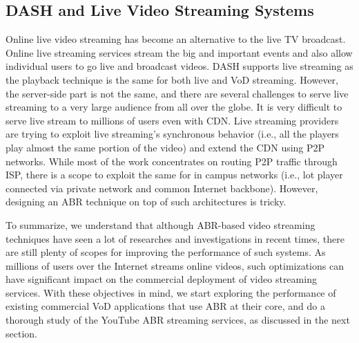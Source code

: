 \subsection{DASH and Live Video Streaming Systems}
Online live video streaming has become an alternative to the live \ac{TV} broadcast. Online live streaming services stream the big and important events and also allow individual users to go live and broadcast videos. \ac{DASH} supports live streaming as the playback technique is the same for both live and \ac{VoD} streaming. However, the server-side part is not the same, and there are several challenges to serve live streaming to a very large audience from all over the globe. It is very difficult to serve live stream to millions of users even with \ac{CDN}. Live streaming providers are trying to exploit live streaming's synchronous behavior (i.e., all the players play almost the same portion of the video) and extend the \ac{CDN} using \ac{P2P} networks. While most of the work concentrates on routing \ac{P2P} traffic through \ac{ISP}, there is a scope to exploit the same for in campus networks (i.e., lot player connected via private network and common Internet backbone). However, designing an \ac{ABR} technique on top of such architectures is tricky.

To summarize, we understand that although \ac{ABR}-based video streaming techniques have seen a lot of researches and investigations in recent times, there are still plenty of scopes for improving the performance of such systems. As millions of users over the Internet streams online videos, such optimizations can have significant impact on the commercial deployment of video streaming services. With these objectives in mind, we start exploring the performance of existing commercial \ac{VoD} applications that use \ac{ABR} at their core, and do a thorough study of the YouTube \ac{ABR} streaming services, as discussed in the next section.

